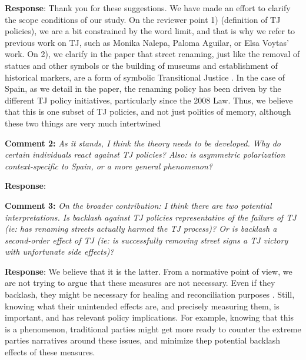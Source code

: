 \documentclass[12pt, a4paper, notitlepage]{article}
\begin{document}
\textbf{Response}: {Thank you for these suggestions. We have made an effort to clarify the scope conditions of our study. On the reviewer point 1) (definition of TJ policies), we are a bit constrained by the word limit, and that is why we refer to previous work on TJ, such as Monika Nalepa, Paloma Aguilar, or Elsa Voytas' work. On 2), we clarify in the paper that street renaming, just like the removal of statues and other symbols or the building of museums and establishment of historical markers, are a form of symbolic Transitional Justice \citep{Ward2021}. In the case of Spain, as we detail in the paper, the renaming policy has been driven by the different TJ policy initiatives, particularly since the 2008 Law. Thus, we believe that this is one subset of TJ policies, and not just politics of memory, although these two things are very much intertwined}

\textbf{Comment 2:} \textit{As it stands, I think the theory needs to be developed. Why do certain individuals react against TJ policies? Also: is asymmetric polarization context-specific to Spain, or a more general phenomenon?}

\textbf{Response}: {\color{red}{pending LAIA}}

\textbf{Comment 3:} \textit{On the broader contribution: I think there are two potential interpretations. Is backlash against TJ policies representative of the failure of TJ (ie: has renaming streets actually harmed the TJ process)? Or is backlash a second-order effect of TJ (ie: is successfully removing street signs a TJ victory with unfortunate side effects)?}

\textbf{Response}: {We believe that it is the latter.
From a normative point of view, we are not trying to argue that these measures are not necessary. Even if they backlash, they might be necessary for healing and reconciliation purposes \citep{Walsh2020, Ward2021}. Still, knowing what their unintended effects are, and precisely measuring them, is important, and has relevant policy implications. For example, knowing that this is a phenomenon, traditional parties might get more ready to counter the extreme parties narratives around these issues, and minimize thep potential backlash effects of these measures.
}
\end{document}
